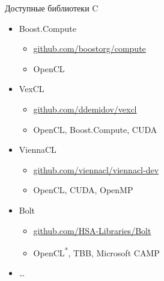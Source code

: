\documentclass[@BEAMER_OPTIONS@]{beamer}
\newcommand{\CXX}{{\rm C}\plusplus}
\begin{document}
\begin{frame}{Доступные библиотеки \CXX}
    \begin{itemize}
        \item Boost.Compute
            \begin{itemize}
                \item \href{https://github.com/boostorg/compute}{github.com/boostorg/compute}
                \item OpenCL
            \end{itemize}
        \item VexCL
            \begin{itemize}
                \item \href{https://github.com/ddemidov/vexcl}{github.com/ddemidov/vexcl}
                \item OpenCL, Boost.Compute, CUDA
            \end{itemize}
        \item ViennaCL
            \begin{itemize}
                \item \href{https://github.com/viennacl/viennacl-dev}{github.com/viennacl/viennacl-dev}
                \item OpenCL, CUDA, OpenMP
            \end{itemize}
        \item Bolt
            \begin{itemize}
                \item \href{https://github.com/HSA-Libraries/Bolt}{github.com/HSA-Libraries/Bolt}
                \item OpenCL\textsuperscript{*}, TBB, Microsoft \CXX AMP
            \end{itemize}
        \item \ldots
    \end{itemize}
\end{frame}
\end{document}
